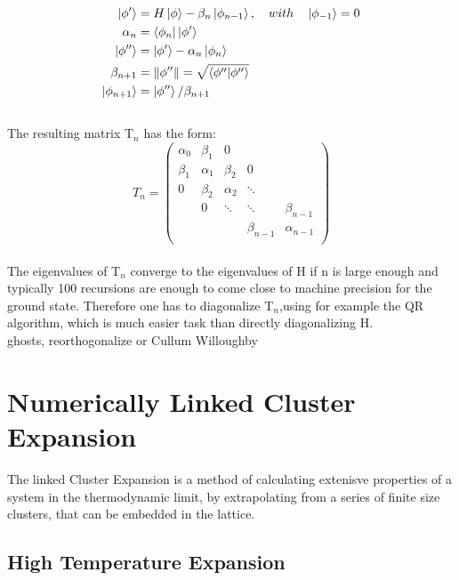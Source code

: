 \documentclass{article}
\begin{document}
\begin{align*}
\ket{\phi'}&=H\ket{\phi} - \beta_n\ket{\phi_{n-1}}, \quad with \quad \ket{\phi_{-1}} = 0\\
\alpha_n &= \bra{\phi_n} \ket{\phi'}\\
\ket{\phi''} &= \ket{\phi'} - \alpha_n\ket{\phi_n}\\
\beta_{n+1} &= \|\phi''\| = \sqrt{\braket{\phi''|\phi''}}\\
\ket{\phi_{n+1}} &= \ket{\phi''}/\beta_{n+1}
\end{align*}\\
The resulting matrix T$_n$ has the form:\\
\begin{equation*}
T_n = 
\begin{pmatrix}
\alpha_0 & \beta_1 & 0 & &\\
\beta_1 & \alpha_1 & \beta_2 & 0 &\\
0 & \beta_2 & \alpha_2 & \ddots & \\
 & 0 & \ddots & \ddots & \beta_{n-1}\\
 & & & \beta_{n-1} & \alpha_{n-1}\\
\end{pmatrix}
\end{equation*}\\
The eigenvalues of T$_n$ converge to the eigenvalues of H if n is
large enough and typically 100 recursions are enough to come close to
machine precision for the ground state. Therefore one has to
diagonalize T$_n$,using for example the QR algorithm, which is much easier task than directly
diagonalizing H.\\
ghosts, reorthogonalize or Cullum Willoughby\\

\section{Numerically Linked Cluster Expansion}
The linked Cluster Expansion is a method of calculating extenisve properties of
a system in the thermodynamic limit, by extrapolating
from a series of finite size clusters, that can be embedded in the
lattice.\\
\subsection{High Temperature Expansion}
\end{document}
